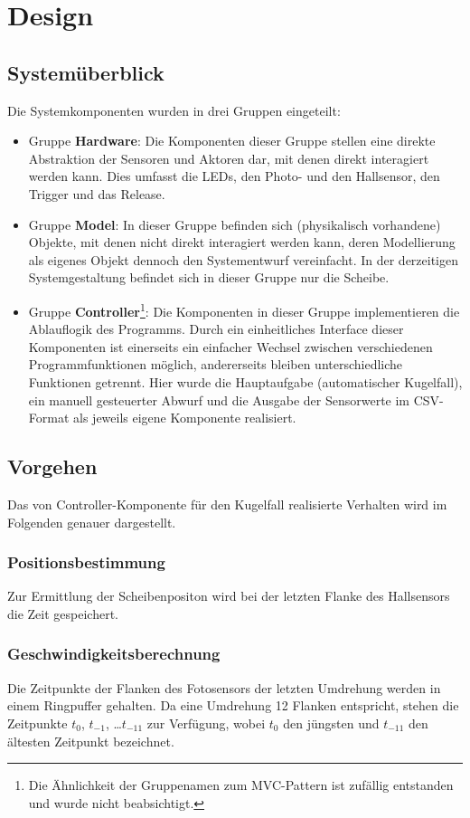 \chapter{Design}\label{k_design}
\section{Systemüberblick}\label{design_systemueberlick}
Die Systemkomponenten wurden in drei Gruppen eingeteilt:
\begin{itemize}
	\item Gruppe \textbf{Hardware}: Die Komponenten dieser Gruppe stellen eine direkte Abstraktion der Sensoren und Aktoren dar, mit denen direkt interagiert werden kann.
	Dies umfasst die LEDs, den Photo- und den Hallsensor, den Trigger und das Release.
	\item Gruppe \textbf{Model}: In dieser Gruppe befinden sich (physikalisch vorhandene) Objekte, mit denen nicht direkt interagiert werden kann, deren Modellierung als eigenes Objekt dennoch den Systementwurf vereinfacht.
	In der derzeitigen Systemgestaltung befindet sich in dieser Gruppe nur die Scheibe.
	\item Gruppe \textbf{Controller}\footnote{Die Ähnlichkeit der Gruppenamen zum MVC-Pattern ist zufällig entstanden und wurde nicht beabsichtigt.}:
	Die Komponenten in dieser Gruppe implementieren die Ablauflogik des Programms.
	Durch ein einheitliches Interface dieser Komponenten ist einerseits ein einfacher Wechsel zwischen verschiedenen Programmfunktionen möglich, andererseits bleiben unterschiedliche Funktionen getrennt.
	Hier wurde die Hauptaufgabe (automatischer Kugelfall), ein manuell gesteuerter Abwurf und die Ausgabe der Sensorwerte im CSV-Format als jeweils eigene Komponente realisiert.
\end{itemize}

\section{Vorgehen}
Das von Controller-Komponente für den Kugelfall realisierte Verhalten wird im Folgenden genauer dargestellt.

\subsection{Positionsbestimmung}\label{design_pos}
Zur Ermittlung der Scheibenpositon wird bei der letzten Flanke des Hallsensors die Zeit gespeichert.

\subsection{Geschwindigkeitsberechnung}\label{design_geschwindigkeit}
Die Zeitpunkte der Flanken des Fotosensors der letzten Umdrehung werden in einem Ringpuffer gehalten.
Da eine Umdrehung 12 Flanken entspricht, stehen die Zeitpunkte $t_0$, $t_{-1}$, \dots $t_{-11}$ zur Verfügung, wobei $t_0$ den jüngsten und $t_{-11}$ den ältesten Zeitpunkt bezeichnet.

